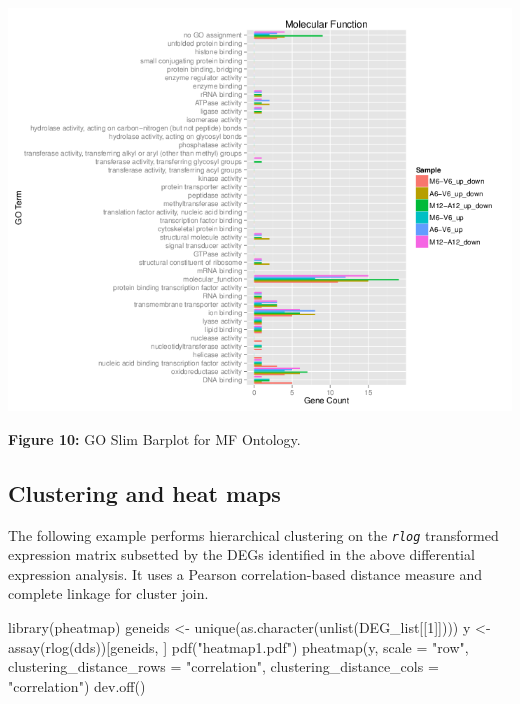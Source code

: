 \documentclass[14pt,]{article}
\newcommand{\hlnum}[1]{\textcolor[rgb]{0.816,0.125,0.439}{#1}}%
\newcommand{\hlstr}[1]{\textcolor[rgb]{0.251,0.627,0.251}{#1}}%
\newcommand{\hlstd}[1]{\textcolor[rgb]{0.251,0.251,0.251}{#1}}%
\newcommand{\hlkwc}[1]{\textcolor[rgb]{0.251,0.251,0.251}{#1}}%
\newcommand{\hlkwd}[1]{\textcolor[rgb]{0.878,0.439,0.125}{#1}}%
\newenvironment{Shaded}{\begin{myshaded}}{\end{myshaded}}
\newcommand{\KeywordTok}[1]{\hlkwd{#1}}
\newcommand{\DataTypeTok}[1]{\hlkwc{#1}}
\newcommand{\DecValTok}[1]{\hlnum{#1}}
\newcommand{\StringTok}[1]{\hlstr{#1}}
\newcommand{\NormalTok}[1]{\hlstd{#1}}
\begin{document}
\includegraphics{GOslimbarplotMF.png}

\textbf{Figure 10:} GO Slim Barplot for MF Ontology.

\hypertarget{clustering-and-heat-maps}{%
\subsection{Clustering and heat maps}\label{clustering-and-heat-maps}}

The following example performs hierarchical clustering on the \emph{\texttt{rlog}} transformed expression matrix subsetted by the DEGs identified in the
above differential expression analysis. It uses a Pearson correlation-based distance measure and complete linkage for cluster join.

\begin{Shaded}
\begin{Highlighting}[]
\KeywordTok{library}\NormalTok{(pheatmap)}
\NormalTok{geneids <-}\StringTok{ }\KeywordTok{unique}\NormalTok{(}\KeywordTok{as.character}\NormalTok{(}\KeywordTok{unlist}\NormalTok{(DEG_list[[}\DecValTok{1}\NormalTok{]])))}
\NormalTok{y <-}\StringTok{ }\KeywordTok{assay}\NormalTok{(}\KeywordTok{rlog}\NormalTok{(dds))[geneids, ]}
\KeywordTok{pdf}\NormalTok{(}\StringTok{"heatmap1.pdf"}\NormalTok{)}
\KeywordTok{pheatmap}\NormalTok{(y, }\DataTypeTok{scale =} \StringTok{"row"}\NormalTok{, }\DataTypeTok{clustering_distance_rows =} \StringTok{"correlation"}\NormalTok{, }\DataTypeTok{clustering_distance_cols =} \StringTok{"correlation"}\NormalTok{)}
\KeywordTok{dev.off}\NormalTok{()}
\end{Highlighting}
\end{Shaded}
\end{document}
